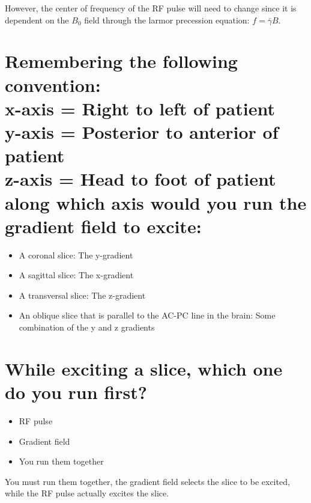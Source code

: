 \documentclass{article}
\begin{document}
However, the center of frequency of the RF pulse will need to change since it is dependent on the $B_0$ field
through the larmor precession equation: $f = \bar{\gamma}B$.

\section{Remembering the following convention: \\
x-axis = Right to left of patient \\
y-axis = Posterior to anterior of patient \\
z-axis = Head to foot of patient \\
along which axis would you run the gradient field to excite:}
\begin{itemize}
    \item A coronal slice: The y-gradient
    \item A sagittal slice: The x-gradient
    \item A transversal slice: The z-gradient
    \item An oblique slice that is parallel to the AC-PC line in the brain: Some combination of the y and z gradients
\end{itemize}

\section{While exciting a slice, which one do you run first?}
\begin{itemize}
    \item RF pulse
    \item Gradient field
    \item You run them together
\end{itemize}
You must run them together, the gradient field selects the slice to be excited, while the RF pulse
actually excites the slice.
\end{document}
